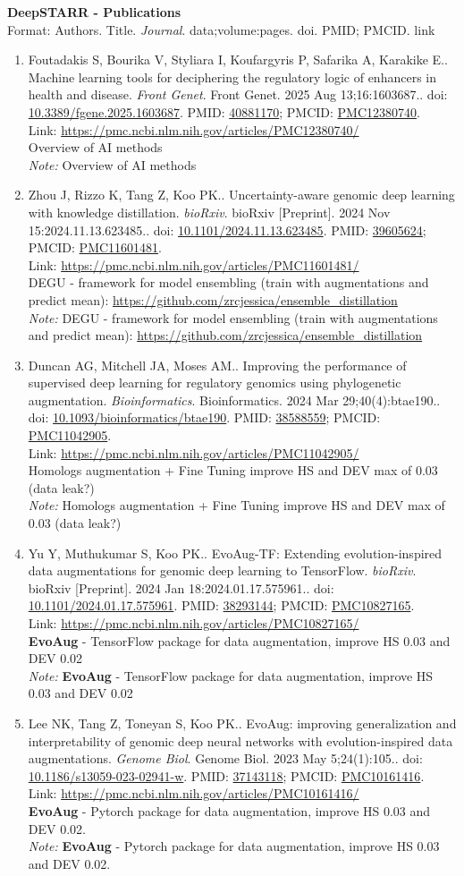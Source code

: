 \documentclass[12pt]{article}
\newcommand{\Pub}[9]{%
  \item #1. #2. \textit{#3}. #4. doi: \href{https://doi.org/#5}{#5}. PMID: \href{https://pubmed.ncbi.nlm.nih.gov/#6/}{#6}; PMCID: \href{https://www.ncbi.nlm.nih.gov/pmc/articles/#7/}{#7}. \\
  \noindent Link: \url{#8}\\
  \ifx#9\relax\else\\\textit{Note:} #9\fi
}
\begin{document}
\begin{center}
  {\LARGE \textbf{DeepSTARR - Publications}}\\[6pt]
  {\small Format: Authors. Title. \textit{Journal}. data;volume:pages. doi. PMID; PMCID. link}
\end{center}

\vspace{6pt}

\begin{enumerate}[leftmargin=*,label=\textbf{\arabic*.}]
\Pub{Foutadakis S, Bourika V, Styliara I, Koufargyris P, Safarika A, Karakike E.}{Machine learning tools for deciphering the regulatory logic of enhancers in health and disease}{Front Genet}{Front Genet. 2025 Aug 13;16:1603687.}{10.3389/fgene.2025.1603687}{40881170}{PMC12380740}{https://pmc.ncbi.nlm.nih.gov/articles/PMC12380740/}{Overview of AI methods}

\Pub{Zhou J, Rizzo K, Tang Z, Koo PK.}{Uncertainty-aware genomic deep learning with knowledge distillation}{bioRxiv}{bioRxiv [Preprint]. 2024 Nov 15:2024.11.13.623485.}{10.1101/2024.11.13.623485}{39605624}{PMC11601481}{https://pmc.ncbi.nlm.nih.gov/articles/PMC11601481/}{DEGU - framework for model ensembling (train with augmentations and predict mean): \url{https://github.com/zrcjessica/ensemble_distillation}}


\Pub{Duncan AG, Mitchell JA, Moses AM.}{Improving the performance of supervised deep learning for regulatory genomics using phylogenetic augmentation}{Bioinformatics}{Bioinformatics. 2024 Mar 29;40(4):btae190.}{10.1093/bioinformatics/btae190}{38588559}{PMC11042905}{https://pmc.ncbi.nlm.nih.gov/articles/PMC11042905/}{Homologs augmentation + Fine Tuning improve HS and DEV max of 0.03 (data leak?)}


\Pub{Yu Y, Muthukumar S, Koo PK.}{EvoAug-TF: Extending evolution-inspired data augmentations for genomic deep learning to TensorFlow}{bioRxiv}{bioRxiv [Preprint]. 2024 Jan 18:2024.01.17.575961.}{10.1101/2024.01.17.575961}{38293144}{PMC10827165}{https://pmc.ncbi.nlm.nih.gov/articles/PMC10827165/}{\textbf{EvoAug} - TensorFlow package for data augmentation, improve HS 0.03 and DEV 0.02}

\newpage

\Pub{Lee NK, Tang Z, Toneyan S, Koo PK.}{EvoAug: improving generalization and interpretability of genomic deep neural networks with evolution-inspired data augmentations}{Genome Biol}{Genome Biol. 2023 May 5;24(1):105.}{10.1186/s13059-023-02941-w}{37143118}{PMC10161416}{https://pmc.ncbi.nlm.nih.gov/articles/PMC10161416/}{\textbf{EvoAug} - Pytorch package for data augmentation, improve HS 0.03 and DEV 0.02.}


\end{enumerate}
\end{document}
